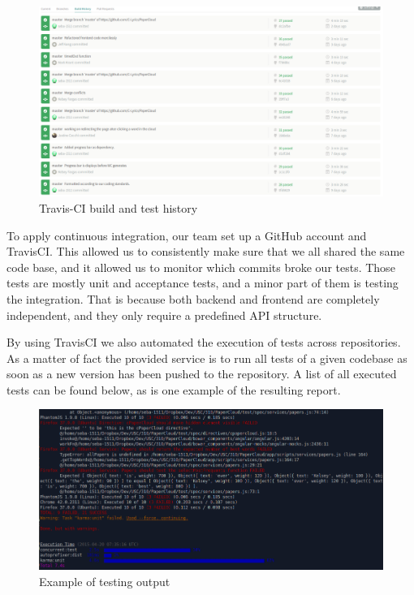 \documentclass[]{article}
\begin{document}
\begin{figure}[htbp]
\centering
\includegraphics{images/travis_history.png}
\caption{Travis-CI build and test history}
\end{figure}

To apply continuous integration, our team set up a GitHub account and
TravisCI. This allowed us to consistently make sure that we all shared
the same code base, and it allowed us to monitor which commits broke our
tests. Those tests are mostly unit and acceptance tests, and a minor
part of them is testing the integration. That is because both backend
and frontend are completely independent, and they only require a
predefined API structure.

By using TravisCI we also automated the execution of tests across
repositories. As a matter of fact the provided service is to run all
tests of a given codebase as soon as a new version has been pushed to
the repository. A list of all executed tests can be found below, as is
one example of the resulting report.

\begin{figure}[htbp]
\centering
\includegraphics{images/test_output.png}
\caption{Example of testing output}
\end{figure}
\end{document}
